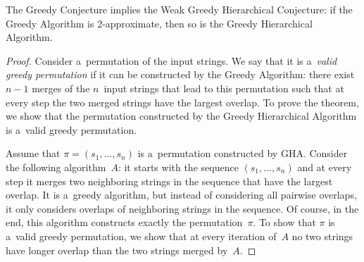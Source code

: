 \begin{theorem}
\label{thm:gr_im_wghc}
The Greedy Conjecture implies the Weak Greedy Hierarchical Conjecture: if the Greedy Algorithm is 2-approximate, then so is the Greedy Hierarchical Algorithm.
\end{theorem}
\begin{proof}
Consider a~permutation of the input strings. We say that it is a~{\em valid greedy permutation} if it can be constructed by the Greedy Algorithm: there exist $n-1$ merges of the $n$~input strings that lead to this permutation such that at every step the two merged strings have the largest overlap. To prove the theorem, we show that the permutation constructed by the Greedy Hierarchical Algorithm is a~valid greedy permutation.

Assume that $\pi=(s_1, \dots, s_n)$ is a~permutation constructed by GHA. Consider the following algorithm~$A$: it starts with the sequence $(s_1, \dots, s_n)$ and at every step it merges two neighboring strings in the sequence that have the largest overlap. It is a~greedy algorithm, but instead of considering all pairwise overlaps, it only considers overlaps of neighboring strings in the sequence. Of course, in the end, this algorithm constructs exactly the permutation~$\pi$. To show that $\pi$ is a~valid greedy permutation, we show that at every iteration of~$A$ no two strings have longer overlap than the two strings merged by~$A$.


\end{proof}
